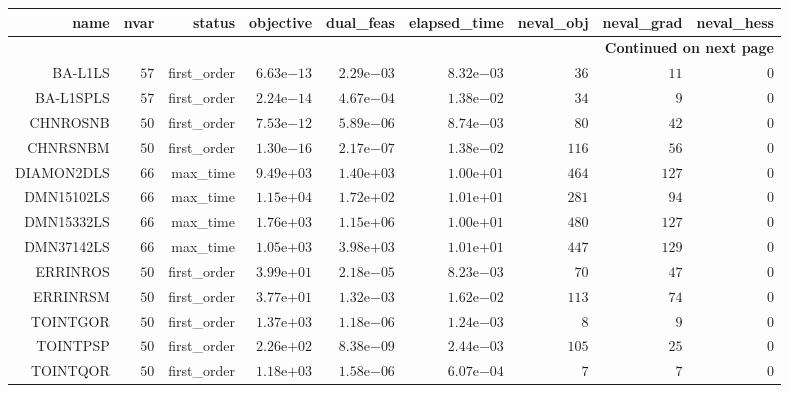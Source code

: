 \begin{longtable}{rrrrrrrrr}
\hline
name & nvar & status & objective & dual\_feas & elapsed\_time & neval\_obj & neval\_grad & neval\_hess \\\hline
\endhead
\hline
\multicolumn{9}{r}{{\bfseries Continued on next page}}\\
\hline
\endfoot
\endlastfoot
BA-L1LS & \(    57\) & first\_order & \( 6.63\)e\(-13\) & \( 2.29\)e\(-03\) & \( 8.32\)e\(-03\) & \(    36\) & \(    11\) & \(     0\) \\
BA-L1SPLS & \(    57\) & first\_order & \( 2.24\)e\(-14\) & \( 4.67\)e\(-04\) & \( 1.38\)e\(-02\) & \(    34\) & \(     9\) & \(     0\) \\
CHNROSNB & \(    50\) & first\_order & \( 7.53\)e\(-12\) & \( 5.89\)e\(-06\) & \( 8.74\)e\(-03\) & \(    80\) & \(    42\) & \(     0\) \\
CHNRSNBM & \(    50\) & first\_order & \( 1.30\)e\(-16\) & \( 2.17\)e\(-07\) & \( 1.38\)e\(-02\) & \(   116\) & \(    56\) & \(     0\) \\
DIAMON2DLS & \(    66\) & max\_time & \( 9.49\)e\(+03\) & \( 1.40\)e\(+03\) & \( 1.00\)e\(+01\) & \(   464\) & \(   127\) & \(     0\) \\
DMN15102LS & \(    66\) & max\_time & \( 1.15\)e\(+04\) & \( 1.72\)e\(+02\) & \( 1.01\)e\(+01\) & \(   281\) & \(    94\) & \(     0\) \\
DMN15332LS & \(    66\) & max\_time & \( 1.76\)e\(+03\) & \( 1.15\)e\(+06\) & \( 1.00\)e\(+01\) & \(   480\) & \(   127\) & \(     0\) \\
DMN37142LS & \(    66\) & max\_time & \( 1.05\)e\(+03\) & \( 3.98\)e\(+03\) & \( 1.01\)e\(+01\) & \(   447\) & \(   129\) & \(     0\) \\
ERRINROS & \(    50\) & first\_order & \( 3.99\)e\(+01\) & \( 2.18\)e\(-05\) & \( 8.23\)e\(-03\) & \(    70\) & \(    47\) & \(     0\) \\
ERRINRSM & \(    50\) & first\_order & \( 3.77\)e\(+01\) & \( 1.32\)e\(-03\) & \( 1.62\)e\(-02\) & \(   113\) & \(    74\) & \(     0\) \\
TOINTGOR & \(    50\) & first\_order & \( 1.37\)e\(+03\) & \( 1.18\)e\(-06\) & \( 1.24\)e\(-03\) & \(     8\) & \(     9\) & \(     0\) \\
TOINTPSP & \(    50\) & first\_order & \( 2.26\)e\(+02\) & \( 8.38\)e\(-09\) & \( 2.44\)e\(-03\) & \(   105\) & \(    25\) & \(     0\) \\
TOINTQOR & \(    50\) & first\_order & \( 1.18\)e\(+03\) & \( 1.58\)e\(-06\) & \( 6.07\)e\(-04\) & \(     7\) & \(     7\) & \(     0\) \\\hline
\end{longtable}
